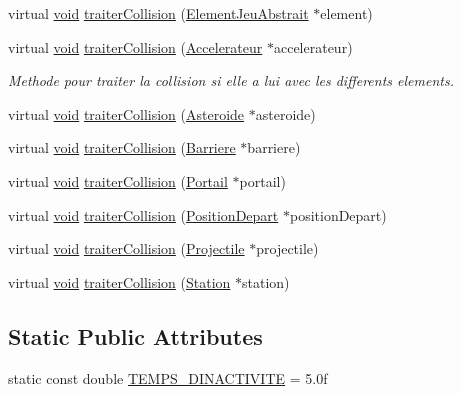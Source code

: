 \begin{DoxyCompactItemize}
\item 
virtual \hyperlink{wglew_8h_aeea6e3dfae3acf232096f57d2d57f084}{void} \hyperlink{class_accelerateur_ab4e3a5f0fb2efdafe4ef6746068c73b0}{traiter\-Collision} (\hyperlink{class_element_jeu_abstrait}{Element\-Jeu\-Abstrait} $\ast$element)
\item 
virtual \hyperlink{wglew_8h_aeea6e3dfae3acf232096f57d2d57f084}{void} \hyperlink{class_accelerateur_ada602e23f6c55a15519d9b552ea3c58b}{traiter\-Collision} (\hyperlink{class_accelerateur}{Accelerateur} $\ast$accelerateur)
\begin{DoxyCompactList}\small\item\em Methode pour traiter la collision si elle a lui avec les differents elements. \end{DoxyCompactList}\item 
virtual \hyperlink{wglew_8h_aeea6e3dfae3acf232096f57d2d57f084}{void} \hyperlink{class_accelerateur_a883b1b41fa23cf033517a2da5f51ccbd}{traiter\-Collision} (\hyperlink{class_asteroide}{Asteroide} $\ast$asteroide)
\item 
virtual \hyperlink{wglew_8h_aeea6e3dfae3acf232096f57d2d57f084}{void} \hyperlink{class_accelerateur_a10595ee8cf0d6f79609733c543971a69}{traiter\-Collision} (\hyperlink{class_barriere}{Barriere} $\ast$barriere)
\item 
virtual \hyperlink{wglew_8h_aeea6e3dfae3acf232096f57d2d57f084}{void} \hyperlink{class_accelerateur_af07cb95ae53037e8947353254ee6ece5}{traiter\-Collision} (\hyperlink{class_portail}{Portail} $\ast$portail)
\item 
virtual \hyperlink{wglew_8h_aeea6e3dfae3acf232096f57d2d57f084}{void} \hyperlink{class_accelerateur_ab14c0dd64c691ee4d586dfeef881ec2b}{traiter\-Collision} (\hyperlink{class_position_depart}{Position\-Depart} $\ast$position\-Depart)
\item 
virtual \hyperlink{wglew_8h_aeea6e3dfae3acf232096f57d2d57f084}{void} \hyperlink{class_accelerateur_a7e55fed6f2d27c73b3b4063f5c992174}{traiter\-Collision} (\hyperlink{class_projectile}{Projectile} $\ast$projectile)
\item 
virtual \hyperlink{wglew_8h_aeea6e3dfae3acf232096f57d2d57f084}{void} \hyperlink{class_accelerateur_a6797ee1374e0cbff0e02b4374da67c35}{traiter\-Collision} (\hyperlink{class_station}{Station} $\ast$station)
\end{DoxyCompactItemize}
\subsection*{Static Public Attributes}
\begin{DoxyCompactItemize}
\item 
static const double \hyperlink{group__inf2990_ga9f211d39002f7446242da80a6c643945}{T\-E\-M\-P\-S\-\_\-\-D\-I\-N\-A\-C\-T\-I\-V\-I\-T\-E} = 5.\-0f
\end{DoxyCompactItemize}
